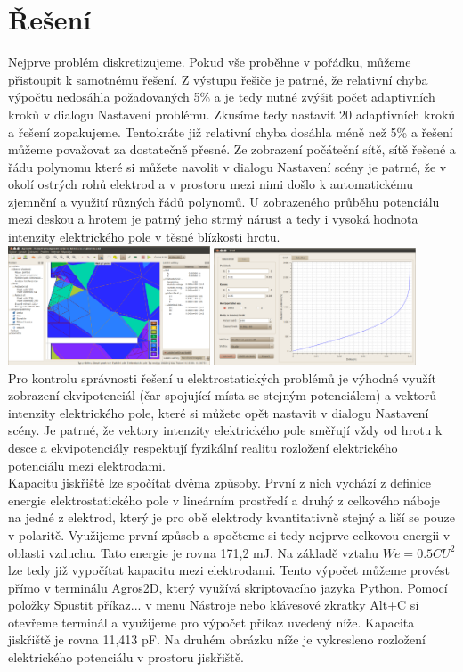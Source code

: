 \documentclass[a4paper, oneside]{article}
\begin{document}
\section{Řešení}
Nejprve problém diskretizujeme. Pokud vše proběhne v pořádku, můžeme přistoupit k samotnému řešení. Z výstupu řešiče je patrné, že relativní chyba výpočtu nedosáhla požadovaných 5\% a je tedy nutné zvýšit počet adaptivních kroků v dialogu Nastavení problému. Zkusíme tedy nastavit 20 adaptivních kroků a řešení zopakujeme. Tentokráte již relativní chyba dosáhla méně než 5\% a řešení můžeme považovat za dostatečně přesné. Ze zobrazení počáteční sítě, sítě řešené a řádu polynomu které si můžete navolit v dialogu Nastavení scény je patrné, že v okolí ostrých rohů elektrod a v prostoru mezi nimi došlo k automatickému zjemnění a využití různých řádů polynomů. U zobrazeného průběhu potenciálu mezi deskou a hrotem je patrný jeho strmý nárust a tedy i vysoká hodnota intenzity elektrického pole v těsné blízkosti hrotu.\\
\includegraphics[width=6cm]{Sit_a_rad_polynomu.eps}
\includegraphics[width=6cm]{Graf.eps}\\		
Pro kontrolu správnosti řešení u elektrostatických problémů je výhodné využít zobrazení ekvipotenciál (čar spojující místa se stejným potenciálem) a vektorů intenzity elektrického pole, které si můžete opět nastavit v dialogu Nastavení scény. Je patrné, že vektory intenzity elektrického pole směřují vždy od hrotu k desce a ekvipotenciály respektují fyzikální realitu rozložení elektrického potenciálu mezi elektrodami.\\
Kapacitu jiskřiště lze spočítat dvěma způsoby. První z nich vychází z definice energie elektrostatického pole v lineárním prostředí a druhý z celkového náboje na jedné z elektrod, který je pro obě elektrody kvantitativně stejný a liší se pouze v polaritě. Využijeme první způsob a spočteme si tedy nejprve celkovou energii v oblasti vzduchu. Tato energie je rovna 171,2 mJ. Na základě vztahu $We = 0.5 CU^2$ lze tedy již vypočítat kapacitu mezi elektrodami. Tento výpočet můžeme provést přímo v terminálu Agros2D, který využívá skriptovacího jazyka Python. Pomocí položky Spustit příkaz... v menu Nástroje nebo klávesové zkratky Alt+C si otevřeme terminál a využijeme pro výpočet příkaz uvedený níže. Kapacita jiskřiště je rovna 11,413 pF. Na druhém obrázku níže je vykresleno rozložení elektrického potenciálu v prostoru jiskřiště.\\
\end{document}
